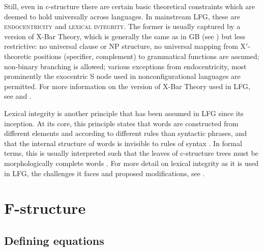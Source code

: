 \documentclass[output=paper]{langscibook}
\begin{document}
 Still, even in c-structure there are certain basic theoretical constraints which are deemed to hold universally across languages. In mainstream LFG, these are \textsc{endocentricity} and \textsc{lexical integrity}. The former is usually captured by a version of X-Bar Theory, which is generally the same as in GB (see \cite{chomsky1970remarks,jackendoff1977}) but less restrictive: no universal clause or NP structure, no universal mapping from X$'$-theoretic positions (specifier, complement) to grammatical functions are assumed; non-binary branching is allowed; various exceptions from endocentricity, most prominently the exocentric S node used in nonconfigurational languages are permitted. For more information on the version of X-Bar Theory used in LFG, see  and .
 
Lexical integrity is another principle that has been assumed in LFG since its inception. At its core, this principle states that words are constructed from different elements and according to different rules than syntactic phrases, and that the internal structure of words is invisible to rules of syntax \parencite[181]{bresnan1995the-lexical}. In formal terms, this is usually interpreted such that the leaves of c-structure trees must be morphologically complete words \parencite[92]{BresnanEtAl2016}. For more detail on lexical integrity as it is used in LFG, the challenges it faces and proposed modifications, see .
 
 \largerpage[-1]
 \section{F-structure\label{sect:intro:f-structure}}
 \label{sect:intro:fstr}
  
  
 \subsection{Defining equations}
 \label{sect:intro:definingequations}
 
\end{document}
